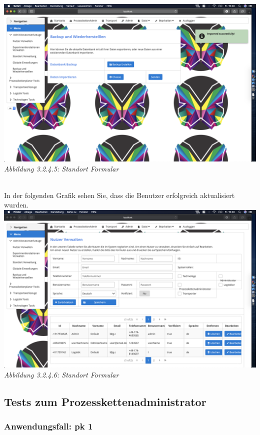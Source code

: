 \documentclass[enabledeprecatedfontcommands,fontsize=12pt,paper=a4,twoside]{scrartcl}
\begin{document}
\hypertarget{sc3.1.5.5}{
\includegraphics[width=1\textwidth]{Screenshots/5BackImported.png}
\textit{Abbildung 3.2.4.5: Standort Formular}
} \\
In der folgenden Grafik sehen Sie, dass die Benutzer erfolgreich aktualisiert wurden.\\

\hypertarget{sc3.1.5.6}{
\includegraphics[width=1\textwidth]{Screenshots/5AddUsers.png}
\textit{Abbildung 3.2.4.6: Standort Formular}
} \\


\subsection{Tests zum Prozesskettenadministrator}

\subsubsection{Anwendungsfall: pk 1}
\end{document}
